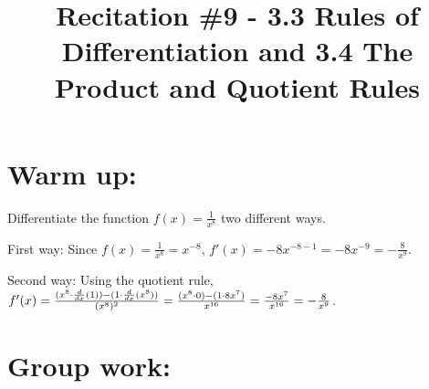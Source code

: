 \documentclass[handout,nooutcomes]{ximera}
\title{Recitation \#9 - 3.3 Rules of Differentiation and 3.4 The Product and Quotient Rules}
\begin{document}
\begin{abstract}		\end{abstract}
\maketitle

\section*{Warm up:} 
Differentiate the function $f(x) = \frac{1}{x^8}$ two different ways.

	\begin{freeResponse}
	First way:  Since $f(x) = \frac{1}{x^8} = x^{-8}$, $f'(x) = -8x^{-8-1} = -8x^{-9} = -\frac{8}{x^9}$.
	
	Second way:  Using the quotient rule, 
	$f'(x) = \frac{(x^8 \cdot \frac{d}{dx}(1)) - (1 \cdot \frac{d}{dx}(x^8))}{(x^8)^2}
	= \frac{(x^8 \cdot 0) - (1 \cdot 8x^7)}{x^{16}}
	= \frac{-8x^7}{x^{16}}
	= - \frac{8}{x^9}$.
	\end{freeResponse}	
	
	
	
	
	

\section*{Group work:}
\end{document}
